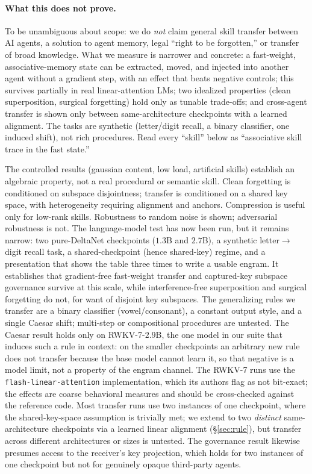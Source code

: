 \documentclass[11pt]{article}
\theoremstyle{definition}
\begin{document}
\paragraph{What this does not prove.}
To be unambiguous about scope: we do \emph{not} claim general skill transfer between AI agents, a solution to agent memory, legal ``right to be forgotten,'' or transfer of broad knowledge. What we measure is narrower and concrete: a fast-weight, associative-memory state can be extracted, moved, and injected into another agent without a gradient step, with an effect that beats negative controls; this survives partially in real linear-attention LMs; two idealized properties (clean superposition, surgical forgetting) hold only as tunable trade-offs; and cross-agent transfer is shown only between same-architecture checkpoints with a learned alignment. The tasks are synthetic (letter/digit recall, a binary classifier, one induced shift), not rich procedures. Read every ``skill'' below as ``associative skill trace in the fast state.''

The controlled results (gaussian content, low load, artificial skills) establish an algebraic property, not a real procedural or semantic skill. Clean forgetting is conditioned on subspace disjointness; transfer is conditioned on a shared key space, with heterogeneity requiring alignment and anchors. Compression is useful only for low-rank skills. Robustness to random noise is shown; adversarial robustness is not. The language-model test has now been run, but it remains narrow: two pure-DeltaNet checkpoints ($1.3$B and $2.7$B), a synthetic letter$\to$digit recall task, a shared-checkpoint (hence shared-key) regime, and a presentation that shows the table three times to write a usable engram. It establishes that gradient-free fast-weight transfer and captured-key subspace governance survive at this scale, while interference-free superposition and surgical forgetting do not, for want of disjoint key subspaces. The generalizing rules we transfer are a binary classifier (vowel/consonant), a constant output style, and a single Caesar shift; multi-step or compositional procedures are untested. The Caesar result holds only on RWKV-7-$2.9$B, the one model in our suite that induces such a rule in context: on the smaller checkpoints an arbitrary new rule does not transfer because the base model cannot learn it, so that negative is a model limit, not a property of the engram channel. The RWKV-7 runs use the \texttt{flash-linear-attention} implementation, which its authors flag as not bit-exact; the effects are coarse behavioral measures and should be cross-checked against the reference code. Most transfer runs use two instances of one checkpoint, where the shared-key-space assumption is trivially met; we extend to two \emph{distinct} same-architecture checkpoints via a learned linear alignment (\S\ref{sec:rule}), but transfer across different architectures or sizes is untested. The governance result likewise presumes access to the receiver's key projection, which holds for two instances of one checkpoint but not for genuinely opaque third-party agents.
\end{document}
